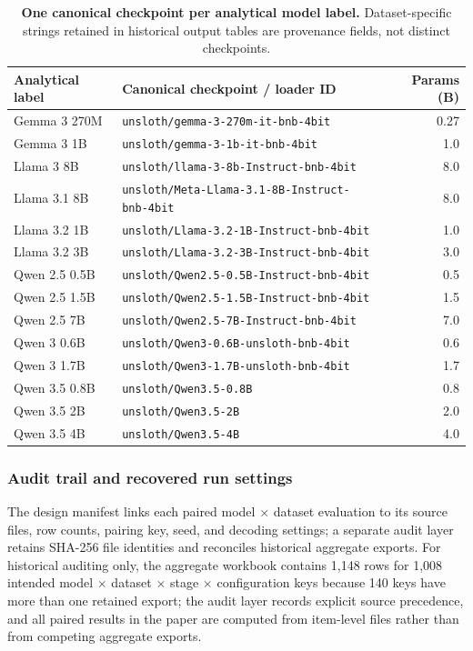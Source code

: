 \documentclass{article}
\begin{document}
\begin{table}[h]
\centering
\small
\setlength{\tabcolsep}{5pt}
\begin{tabular}{llr}
\toprule
\textbf{Analytical label} & \textbf{Canonical checkpoint / loader ID} & \textbf{Params (B)}\\
\midrule
Gemma 3 270M  & \texttt{unsloth/gemma-3-270m-it-bnb-4bit} & 0.27\\
Gemma 3 1B    & \texttt{unsloth/gemma-3-1b-it-bnb-4bit} & 1.0\\
Llama 3 8B    & \texttt{unsloth/llama-3-8b-Instruct-bnb-4bit} & 8.0\\
Llama 3.1 8B  & \texttt{unsloth/Meta-Llama-3.1-8B-Instruct-bnb-4bit} & 8.0\\
Llama 3.2 1B  & \texttt{unsloth/Llama-3.2-1B-Instruct-bnb-4bit} & 1.0\\
Llama 3.2 3B  & \texttt{unsloth/Llama-3.2-3B-Instruct-bnb-4bit} & 3.0\\
Qwen 2.5 0.5B & \texttt{unsloth/Qwen2.5-0.5B-Instruct-bnb-4bit} & 0.5\\
Qwen 2.5 1.5B & \texttt{unsloth/Qwen2.5-1.5B-Instruct-bnb-4bit} & 1.5\\
Qwen 2.5 7B   & \texttt{unsloth/Qwen2.5-7B-Instruct-bnb-4bit} & 7.0\\
Qwen 3 0.6B   & \texttt{unsloth/Qwen3-0.6B-unsloth-bnb-4bit} & 0.6\\
Qwen 3 1.7B   & \texttt{unsloth/Qwen3-1.7B-unsloth-bnb-4bit} & 1.7\\
Qwen 3.5 0.8B & \texttt{unsloth/Qwen3.5-0.8B} & 0.8\\
Qwen 3.5 2B   & \texttt{unsloth/Qwen3.5-2B} & 2.0\\
Qwen 3.5 4B   & \texttt{unsloth/Qwen3.5-4B} & 4.0\\
\bottomrule
\end{tabular}
\caption{\textbf{One canonical checkpoint per analytical model label.} Dataset-specific
strings retained in historical output tables are provenance fields, not
distinct checkpoints.}
\label{tab:checkpoints}
\end{table}

\subsubsection{Audit trail and recovered run settings}
\label{app:audit}
The design manifest links each paired model $\times$ dataset evaluation to its
source files, row counts, pairing key, seed, and decoding settings; a separate
audit layer retains SHA-256 file identities and reconciles historical
aggregate exports. For historical auditing only, the aggregate workbook
contains 1{,}148 rows for 1{,}008 intended model $\times$ dataset $\times$
stage $\times$ configuration keys because 140 keys have more than one retained
export; the audit layer records explicit source precedence, and all paired
results in the paper are computed from item-level files rather than from
competing aggregate exports.
\end{document}

